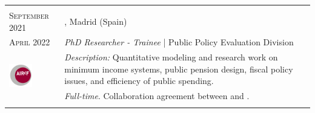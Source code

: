 \begin{longtable}{R{2.5cm}|p{14.8cm}}
 	 \\

 	\textsc{September 2021} & \textsc{}, \faMapMarker \hspace{0.5 mm} Madrid (Spain) \\
 	\textsc{April 2022} 	& \textit{PhD Researcher - Trainee} | Public Policy Evaluation Division\\
	 & 
	\footnotesize{\faTasks \emph{ Description: }Quantitative modeling and research work on minimum income systems, public pension design, fiscal policy issues, and efficiency of public spending.} \\ &
	\footnotesize{\faFileText \emph{ Full-time}. Collaboration agreement between  \hspace{0.5 mm} and .}\\
 	 \\
 

\end{longtable}
